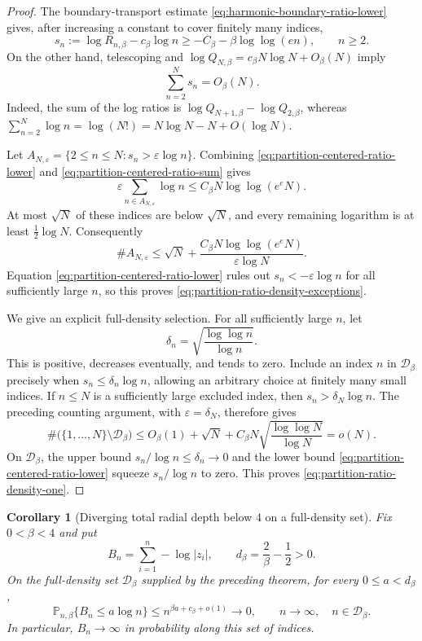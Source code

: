 \documentclass[11pt,a4paper]{article}
\numberwithin{equation}{section}
\newtheorem{corollary}[theorem]{Corollary}
\theoremstyle{definition}
\theoremstyle{remark}
\begin{document}
\begin{proof}
The boundary-transport estimate
\eqref{eq:harmonic-boundary-ratio-lower} gives, after increasing a
constant to cover finitely many indices,
\begin{equation}
 s_n:=\log R_{n,\beta}-c_\beta\log n
 \geq-C_\beta-\beta\log\log(en),\qquad n\geq2.
 \label{eq:partition-centered-ratio-lower}
\end{equation}
On the other hand, telescoping and
$\log Q_{N,\beta}=c_\beta N\log N+O_\beta(N)$ imply
\begin{equation}
 \sum_{n=2}^N s_n=O_\beta(N).
 \label{eq:partition-centered-ratio-sum}
\end{equation}
Indeed, the sum of the log ratios is
$\log Q_{N+1,\beta}-\log Q_{2,\beta}$, whereas
$\sum_{n=2}^N\log n=\log(N!)=N\log N-N+O(\log N)$.

Let $A_{N,\varepsilon}=\{2\leq n\leq N:s_n>\varepsilon\log n\}$.
Combining \eqref{eq:partition-centered-ratio-lower} and
\eqref{eq:partition-centered-ratio-sum} gives
\[
 \varepsilon\sum_{n\in A_{N,\varepsilon}}\log n
 \leq C_\beta N\log\log(e^eN).
\]
At most $\sqrt N$ of these indices are below $\sqrt N$, and every
remaining logarithm is at least $\tfrac12\log N$. Consequently
\[
 \#A_{N,\varepsilon}
 \leq\sqrt N+
    \frac{C_\beta N\log\log(e^eN)}{\varepsilon\log N}.
\]
Equation \eqref{eq:partition-centered-ratio-lower} rules out
$s_n<-\varepsilon\log n$ for all sufficiently large $n$, so this proves
\eqref{eq:partition-ratio-density-exceptions}.

We give an explicit full-density selection. For all sufficiently large
$n$, let
\[
 \delta_n=\sqrt{\frac{\log\log n}{\log n}}.
\]
This is positive, decreases eventually, and tends to zero. Include an
index $n$ in $\mathcal D_\beta$ precisely when
$s_n\leq\delta_n\log n$, allowing an arbitrary choice at finitely many
small indices. If $n\leq N$ is a sufficiently large excluded index,
then $s_n>\delta_N\log n$. The preceding counting argument, with
$\varepsilon=\delta_N$, therefore gives
\[
 \#\bigl(\{1,\ldots,N\}\setminus\mathcal D_\beta\bigr)
 \leq O_\beta(1)+\sqrt N+
     C_\beta N\sqrt{\frac{\log\log N}{\log N}}=o(N).
\]
On $\mathcal D_\beta$, the upper bound $s_n/\log n\leq\delta_n\to0$
and the lower bound \eqref{eq:partition-centered-ratio-lower} squeeze
$s_n/\log n$ to zero. This proves
\eqref{eq:partition-ratio-density-one}.
\end{proof}

\begin{corollary}[Diverging total radial depth below $4$ on a full-density set]
\label{cor:depth-density-one-below-four}
Fix $0<\beta<4$ and put
\[
 B_n=\sum_{i=1}^n-\log|z_i|,\qquad
 d_\beta=\frac2\beta-\frac12>0.
\]
On the full-density set $\mathcal D_\beta$ supplied by the preceding
theorem, for every $0\leq a<d_\beta$,
\begin{equation}
 \mathbb P_{n,\beta}\{B_n\leq a\log n\}
 \leq n^{\beta a+c_\beta+o(1)}\longrightarrow0,
 \qquad n\to\infty,\quad n\in\mathcal D_\beta.
 \label{eq:depth-density-one-below-four}
\end{equation}
In particular, $B_n\to\infty$ in probability along this set of indices.
\end{corollary}
\end{document}
